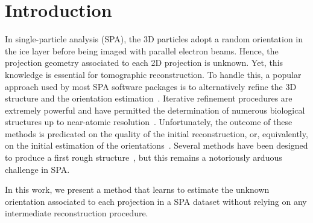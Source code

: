 \section{Introduction}



In single-particle analysis (SPA), the 3D particles adopt a random orientation in the ice layer before being imaged with parallel electron beams.
Hence, the projection geometry associated to each 2D projection is unknown.
Yet, this knowledge is essential for tomographic reconstruction.
To handle this, a popular approach used by most SPA software packages is to alternatively refine the 3D structure and the orientation estimation~\cite{penczek1994ribosome,Baker1996,Dempster1977,sigworth1998maximum,scheres2012bayesian}.
Iterative refinement procedures are extremely powerful and have permitted the determination of numerous biological structures up to near-atomic resolution~\cite{kuhlbrandt2014resolution}.
Unfortunately, the outcome of these methods is predicated on the quality of the initial reconstruction, or, equivalently, on the initial estimation of the orientations~\cite{sorzano2006optimization,henderson2012outcome}.
Several methods have been designed to produce a first rough structure~\cite{singer2010detecting,wang2013orientation,greenberg2017common,punjani2017cryosparc,pragier2019common}, but this remains a notoriously arduous challenge in SPA.

In this work, we present a method that learns to estimate the unknown orientation associated to each projection in a SPA dataset without relying on any intermediate reconstruction procedure.
